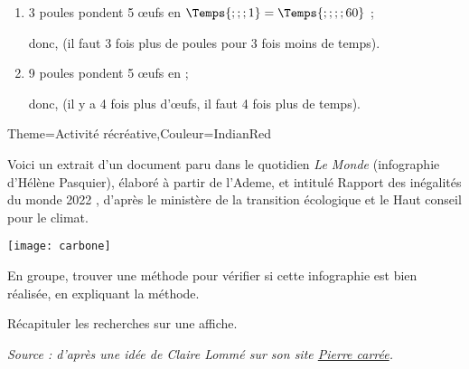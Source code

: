 \begin{Maquette}[Fiche,CorrigeFin,Colonnes=2]{}
\begin{multicols}{2}
      \begin{Solution}
         \begin{enumerate}
            \item 3 poules pondent 5 \oe ufs en $\Temps{;;;1} =\Temps{;;;;60}$ ; \par
               donc,  (il faut 3 fois plus de poules pour 3 fois moins de temps). \par
            \item 9 poules pondent 5 \oe ufs en  ; \par
               donc,  (il y a 4 fois plus d'\oe ufs, il faut 4 fois plus de temps).
         \end{enumerate}
      \end{Solution}

   \end{multicols}

\end{Maquette}


\begin{Maquette}[Cours]{Theme={Activité récréative},Couleur={IndianRed}}
    
      
         Voici un extrait d’un document paru dans le quotidien {\it Le Monde} (infographie d’Hélène Pasquier), élaboré à partir de l’Ademe, et intitulé \og Rapport des inégalités du monde 2022 \fg, d’après le ministère de la transition écologique et le Haut conseil pour le climat. \par \smallskip 
         \texttt{[image: carbone]}
      
         En groupe, trouver une méthode pour vérifier si cette infographie est bien réalisée, en expliquant la méthode. \par
         Récapituler les recherches sur une affiche.
   
   \vfill\hfill {\it\footnotesize Source : d'après une idée de Claire Lommé sur son site \href{https://clairelommeblog.wordpress.com/category/maths-et-societe}{Pierre carrée}.}

\end{Maquette}